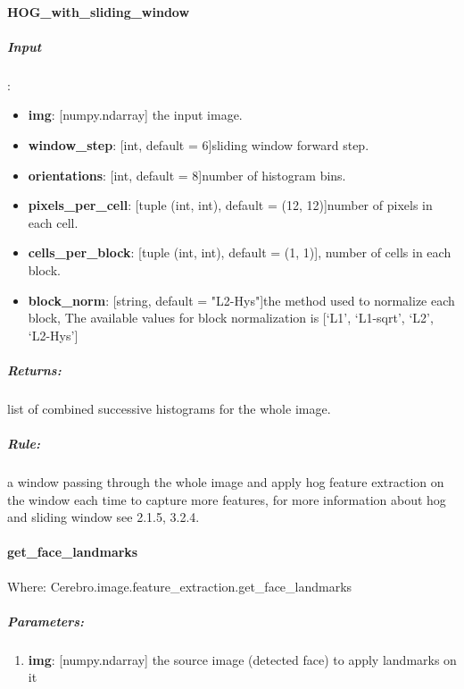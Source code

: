 \paragraph{HOG\_with\_sliding\_window}
\subparagraph{Input}:
\begin{changemargin}{0.5cm}{0cm}
\begin{itemize}
\item  \textbf{img}: [numpy.ndarray] the input image.
\item  \textbf{window\_step}: [int, default = 6]sliding window forward step.
\item  \textbf{orientations}: [int, default = 8]number of histogram bins.
\item \textbf{pixels\_per\_cell}: [tuple (int, int), default = (12, 12)]number of pixels in each cell.
\item  \textbf{cells\_per\_block}: [tuple (int, int), default = (1, 1)], number of cells in each block.
\item  \textbf{block\_norm}: [string, default = "L2-Hys"]the method used to normalize each block, The available values for block normalization is [‘L1’, ‘L1-sqrt’, ‘L2’, ‘L2-Hys’]
\end{itemize}
\end{changemargin}

\subparagraph{Returns:}
\begin{changemargin}{0.5cm}{0cm}
list of combined successive histograms for the whole image.
\end{changemargin}

\subparagraph{Rule:} 
\begin{changemargin}{0.5cm}{0cm}
a window passing through the whole image and apply hog feature extraction on the window each time to capture more features, for more information about hog and sliding window see 2.1.5, 3.2.4.
\end{changemargin}

\paragraph{get\_face\_landmarks}
Where: Cerebro.image.feature\_extraction.get\_face\_landmarks
\subparagraph{Parameters:}
\begin{changemargin}{0.5cm}{0cm}
	\begin{enumerate} 
		\item \textbf{img}: [numpy.ndarray] the source image (detected face) to apply landmarks on it
	\end{enumerate}
\end{changemargin}

